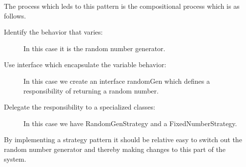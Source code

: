 \noindent
The process which leds to this pattern is the compositional process which is as follows.


\begin{description}
    \item[Identify the behavior that varies:] In this case it is the random number generator.  

    \item[Use interface which encapsulate the variable behavior:]  In this case we create an interface randomGen which defines a  responsibility of returning a random number.     
    
    \item[Delegate the responsibility to a specialized classes:] In this case we have RandomGenStrategy and a FixedNumberStrategy.
\end{description}

\noindent
By implementing a strategy pattern it should be relative easy to switch out the random number generator and thereby making changes to this part of the system.